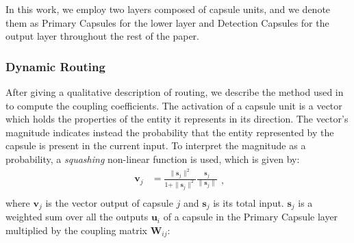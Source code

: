In this work, we employ two layers composed of capsule units, and we denote them as Primary Capsules for the lower layer and Detection Capsules for the output layer throughout the rest of the paper.


\subsubsection{Dynamic Routing}
\label{ssec:routing}

After giving a qualitative description of routing, we describe the method used in \cite{sabour2017dynamic} to compute the coupling coefficients.
The activation of a capsule unit is a vector which holds the properties of the entity it represents in its direction. 
The vector's magnitude indicates instead the probability that the entity represented by the capsule is present in the current input.
To interpret the magnitude as a probability, a \textit{squashing} non-linear function is used, which is given by:
\begin{equation}
\label{eq:squashing}
\begin{split}
\mathbf{v}_j & = \frac{\| \mathbf{s}_j \|^2}{ 1 + \| \mathbf{s}_j \|^2} \frac{\mathbf{s}_j}{ \|\mathbf{s}_j \|}  \\
\end{split},
\end{equation}
where $\mathbf{v}_j$ is the vector output of capsule $j$ and $\mathbf{s}_j$ is its total input. $\mathbf{s}_j$ is a weighted sum over all the
outputs $\mathbf{u}_i$ of a capsule in the Primary Capsule layer multiplied by the coupling matrix $\mathbf{W}_{ij}$:

